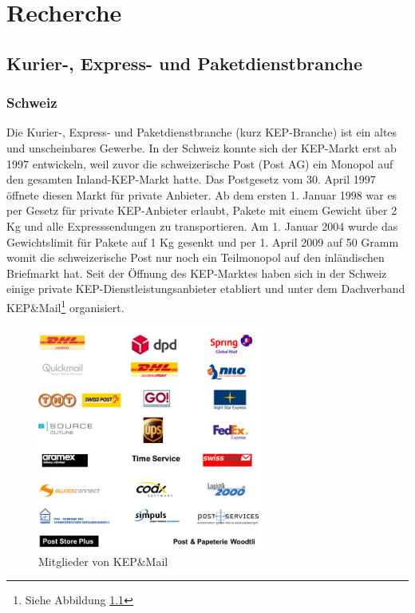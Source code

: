 \chapter{Recherche}
\label{sec:recherche}

\section{Kurier-, Express- und Paketdienstbranche}
\subsection{Schweiz}
Die Kurier-, Express- und Paketdienstbranche (kurz KEP-Branche) ist ein altes und unscheinbares Gewerbe. In der Schweiz konnte sich der KEP-Markt erst ab 1997 entwickeln, weil zuvor die schweizerische Post (Post AG) ein Monopol auf den gesamten Inland-KEP-Markt hatte. Das Postgesetz vom 30. April 1997 \citep[]{postgesetz.sr783} öffnete diesen Markt für private Anbieter. Ab dem ersten 1. Januar 1998 war es per Gesetz für private KEP-Anbieter erlaubt, Pakete mit einem Gewicht über 2 Kg und alle Expresssendungen zu transportieren. Am 1. Januar 2004 wurde das Gewichtslimit für Pakete auf 1 Kg gesenkt und per 1. April 2009 auf 50 Gramm womit die schweizerische Post nur noch ein Teilmonopol auf den inländischen Briefmarkt hat. Seit der Öffnung des KEP-Marktes haben sich in der Schweiz einige private KEP-Dienstleistungsanbieter etabliert und unter dem Dachverband KEP\&Mail\footnote{Siehe Abbildung \ref{fig1:kepmail}} organisiert.
\begin{figure}[ht]
	\centering
  \includegraphics[width=0.66\textwidth]{images/kepmailMitglieder.png}
	\caption{Mitglieder von KEP\&Mail}
	\label{fig1:kepmail}
\end{figure}
